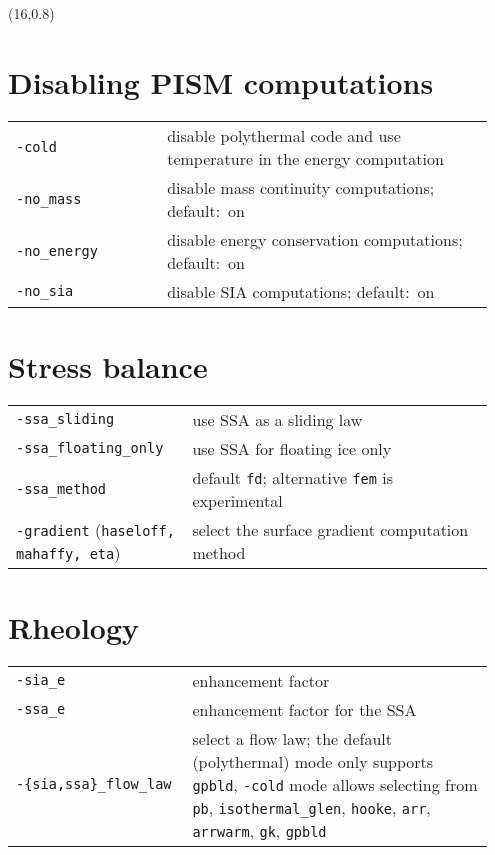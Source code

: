 \documentclass[landscape]{article}
\begin{document}
\begin{textblock}{15}(16,0.8)

\section{Disabling PISM computations}
\label{sec:switches}
\begin{tabular}{@{}p{0.3\linewidth}p{0.65\linewidth}@{}}
\texttt{-cold} & disable polythermal code and use temperature in the energy
computation\\
\texttt{-no_mass} & disable mass continuity computations; \mbox{default: on}\\
\texttt{-no_energy} & disable energy conservation computations; \mbox{default: on}\\
\texttt{-no_sia} & disable SIA computations; \mbox{default: on}
\end{tabular}

\section{Stress balance}
\label{sec:stress-balance}

\begin{tabular}{@{}p{0.35\linewidth}p{0.6\linewidth}@{}}
\texttt{-ssa_sliding} & use SSA as a sliding law\\
\texttt{-ssa_floating_only} & use SSA for floating ice only\\
\texttt{-ssa_method} & default \texttt{fd}; alternative \texttt{fem} is experimental\\
\texttt{-gradient} (\texttt{haseloff, mahaffy, eta})& select the surface
gradient computation method\\
\end{tabular}

\section{Rheology}
\label{sec:rheology}
\begin{tabular}{@{}p{0.35\linewidth}p{0.6\linewidth}@{}}
\texttt{-sia_e} & enhancement factor\\
\texttt{-ssa_e} & enhancement factor for the SSA\\
\texttt{-\{sia,ssa\}_flow_law} & select a flow law; the default (polythermal) mode only
supports \texttt{gpbld}, \texttt{-cold} mode allows selecting from \texttt{pb},
\texttt{isothermal_glen}, \texttt{hooke}, \texttt{arr}, \texttt{arrwarm},
\texttt{gk}, \texttt{gpbld}\\
\end{tabular}



\end{textblock}
\end{document}
